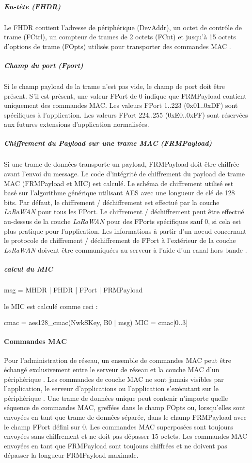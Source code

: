 \documentclass[11pt]{article}
\begin{document}
\subparagraph{ En-tête (FHDR)}
Le FHDR contient l'adresse de périphérique  (DevAddr), un octet de contrôle de trame (FCtrl), un compteur de trames de 2 octets (FCnt) et jusqu'à 15 octets d'options de trame (FOpts) utilisés pour transporter des commandes MAC .

\subparagraph{Champ du port (Fport)}
Si le champ payload  de la trame n'est pas vide, le champ de port doit être présent. S'il est présent, une valeur FPort de 0 indique que FRMPayload contient uniquement des commandes MAC. Les valeurs FPort 1..223 (0x01..0xDF) sont spécifiques à l'application. Les valeurs FPort 224..255 (0xE0..0xFF) sont réservées aux futures extensions d'application normalisées.

\subparagraph{Chiffrement du Payload sur une trame MAC (FRMPayload)}
Si une trame de données transporte un payload, FRMPayload doit être chiffrée avant l'envoi du  message.
Le code d'intégrité de chiffrement du payload de trame MAC (FRMPayload et MIC) est calculé. Le schéma de chiffrement utilisé est basé sur l'algorithme générique utilisant AES avec une longueur de clé de 128 bits. Par défaut, le chiffrement / déchiffrement est effectué par la couche  \textit{LoRaWAN} pour tous les FPort. Le chiffrement / déchiffrement peut être effectué au-dessus de la couche  \textit{LoRaWAN} pour des FPorts spécifiques sauf 0, si cela est plus pratique pour l'application. Les informations  à partir d'un noeud concernant le protocole de chiffrement / déchiffrement de FPort à l'extérieur de la couche \textit{LoRaWAN} doivent être communiquées au serveur à l'aide d'un canal hors bande .
\subparagraph{calcul du MIC}

msg = MHDR | FHDR | FPort | FRMPayload

le MIC est calculé comme ceci :

cmac = aes128\_cmac(NwkSKey, B0 | msg)
MIC = cmac[0..3]
\paragraph{Commandes MAC}
Pour l'administration de réseau, un ensemble de commandes MAC peut être échangé exclusivement entre le serveur de réseau et la couche MAC d'un périphérique . Les commandes de couche MAC ne sont jamais visibles par l'application, le serveur d'applications ou l'application s'exécutant sur le périphérique .
Une trame de données unique peut contenir n'importe quelle séquence de commandes MAC, greffées dans le champ FOpts ou, lorsqu'elles sont envoyées en tant que trame de données séparée, dans le champ FRMPayload avec le champ FPort défini sur 0. Les commandes MAC superposées sont toujours envoyées sans chiffrement et ne doit pas dépasser 15 octets. Les commandes MAC envoyées en tant que FRMPayload sont toujours chiffrées et ne doivent pas dépasser la longueur FRMPayload maximale.
\end{document}
